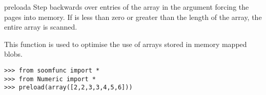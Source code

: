 \begin{funcdesc}{preload}{a }
Step backwards over  entries of the array in the 
argument forcing the pages into memory.  If  is less than
zero or greater than the length of the array, the entire array is
scanned.

This function is used to optimise the use of arrays stored in memory
mapped blobs.

\begin{verbatim}
>>> from soomfunc import * 
>>> from Numeric import *
>>> preload(array([2,2,3,3,4,5,6]))
\end{verbatim}
\end{funcdesc}
